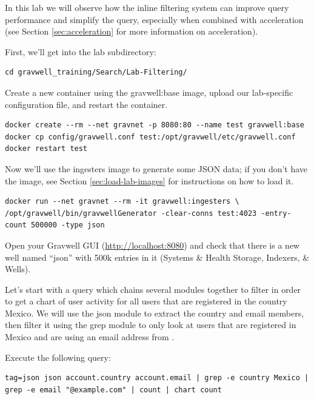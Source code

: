 In this lab we will observe how the inline
filtering system can improve query performance and simplify the query,
especially when combined with acceleration (see Section \ref{sec:acceleration} for more information
on acceleration).

First, we'll get into the lab subdirectory:

\begin{Verbatim}[breaklines=true]
cd gravwell_training/Search/Lab-Filtering/
\end{Verbatim}

Create a new container using the gravwell:base image, upload our lab-specific
configuration file, and restart the container.

\begin{Verbatim}[breaklines=true]
docker create --rm --net gravnet -p 8080:80 --name test gravwell:base
docker cp config/gravwell.conf test:/opt/gravwell/etc/gravwell.conf
docker restart test
\end{Verbatim}

Now we'll use the ingesters image to generate some JSON data; if you don't have the  image, see Section \ref{sec:load-lab-images} for instructions on how to load it.

\begin{Verbatim}[breaklines=true]
docker run --net gravnet --rm -it gravwell:ingesters \
/opt/gravwell/bin/gravwellGenerator -clear-conns test:4023 -entry-count 500000 -type json
\end{Verbatim}

Open your Gravwell GUI (\href{http://localhost:8080}{http://localhost:8080}) and check
that there is a new well named ``json'' with 500k entries in it (Systems \& Health \textrightarrow Storage, Indexers, \& Wells).

Let's start with a query which chains several modules together to
filter in order to get a chart of user activity for all users that are
registered in the country Mexico. We will use the json module to
extract the country and email members, then filter it using the grep
module to only look at users that are registered in Mexico and are using
an email address from \code{example.com}.

Execute the following query:

\begin{Verbatim}[breaklines=true]
tag=json json account.country account.email | grep -e country Mexico |
grep -e email "@example.com" | count | chart count
\end{Verbatim}

